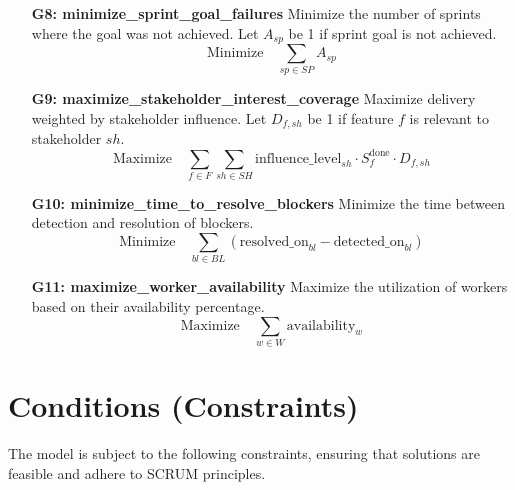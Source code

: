 \documentclass[11pt]{article}
\begin{document}
\begin{itemize}
    \item[\textbf{G8: minimize\_sprint\_goal\_failures}] Minimize the number of sprints where the goal was not achieved. Let $A_{sp}$ be 1 if sprint goal is not achieved.
    $$ \text{Minimize} \quad \sum_{sp \in SP} A_{sp} $$

    \item[\textbf{G9: maximize\_stakeholder\_interest\_coverage}] Maximize delivery weighted by stakeholder influence. Let $D_{f,sh}$ be 1 if feature $f$ is relevant to stakeholder $sh$.
    $$ \text{Maximize} \quad \sum_{f \in F} \sum_{sh \in SH} \text{influence\_level}_{sh} \cdot S_{f}^{\text{done}} \cdot D_{f,sh} $$

    \item[\textbf{G10: minimize\_time\_to\_resolve\_blockers}] Minimize the time between detection and resolution of blockers.
    $$ \text{Minimize} \quad \sum_{bl \in BL} (\text{resolved\_on}_{bl} - \text{detected\_on}_{bl}) $$

    \item[\textbf{G11: maximize\_worker\_availability}] Maximize the utilization of workers based on their availability percentage.
    $$ \text{Maximize} \quad \sum_{w \in W} \text{availability}_{w} $$
\end{itemize}


\section{Conditions (Constraints)}
The model is subject to the following constraints, ensuring that solutions are feasible and adhere to SCRUM principles.
\end{document}
